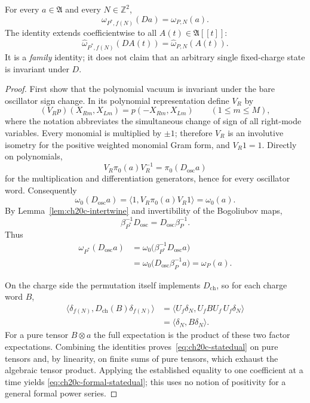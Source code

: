 \begin{theorem}
\label{thm:ch20c-state}
For every $a\in\mathfrak A$ and every $N\in\mathbb Z^2$,
\begin{equation}
 \omega_{P^*,f(N)}(D a)=\omega_{P,N}(a).
 \label{eq:ch20c-statedual}
\end{equation}
The identity extends coefficientwise to all
$A(t)\in\mathfrak A[[t]]$:
\begin{equation}
 \widehat\omega_{P^*,f(N)}(D A(t))
   =\widehat\omega_{P,N}(A(t)).
 \label{eq:ch20c-formal-statedual}
\end{equation}
It is a \emph{family} identity; it does not claim that an arbitrary
single fixed-charge state is invariant under $D$.
\end{theorem}
\begin{proof}
First show that the polynomial vacuum is invariant under the bare
oscillator sign change.  In its polynomial representation define
$V_R$ by
\[
 (V_Rp)(X_{Rm},X_{Lm})
   =p(-X_{Rm},X_{Lm})\qquad(1\leq m\leq M),
\]
where the notation abbreviates the simultaneous change of sign of
all right-mode variables.  Every monomial is multiplied by $\pm1$;
therefore $V_R$ is an involutive isometry for the positive weighted
monomial Gram form, and $V_R1=1$.  Directly on polynomials,
\[
 V_R\pi_0(a)V_R^{-1}=\pi_0(D_{\mathrm{osc}}a)
\]
for the multiplication and differentiation generators, hence for
every oscillator word.  Consequently
\[
 \omega_0(D_{\mathrm{osc}}a)
 =\langle1,V_R\pi_0(a)V_R1\rangle
 =\omega_0(a).
\]
By Lemma~\ref{lem:ch20c-intertwine} and invertibility of the
Bogoliubov maps,
\[
 \beta_{P^*}^{-1}D_{\mathrm{osc}}
  =D_{\mathrm{osc}}\beta_P^{-1}.
\]
Thus
\begin{align*}
 \omega_{P^*}(D_{\mathrm{osc}}a)
 &=\omega_0\bigl(\beta_{P^*}^{-1}
                     D_{\mathrm{osc}}a\bigr)\\
 &=\omega_0\bigl(D_{\mathrm{osc}}\beta_P^{-1}a\bigr)
 =\omega_P(a).
\end{align*}

On the charge side the permutation itself implements
$D_{\mathrm{ch}}$, so for each charge word $B$,
\begin{align*}
 \langle\delta_{f(N)},D_{\mathrm{ch}}(B)
              \delta_{f(N)}\rangle
 &=\langle U_f\delta_N,U_fBU_f\,U_f\delta_N\rangle\\
 &=\langle\delta_N,B\delta_N\rangle.
\end{align*}
For a pure tensor $B\otimes a$ the full expectation is the
product of these two factor expectations.  Combining the identities
proves~\eqref{eq:ch20c-statedual} on pure tensors and, by
linearity, on finite sums of pure tensors, which exhaust the
algebraic tensor product.  Applying the established equality to
one coefficient at a time yields
\eqref{eq:ch20c-formal-statedual}; this uses no notion of positivity
for a general formal power series.
\end{proof}

